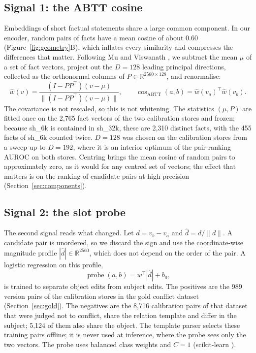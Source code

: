 \documentclass[11pt]{article}
\newcommand{\sub}[1]{\textsf{sh\_#1}}                    %
\begin{document}
\subsection{Signal 1: the ABTT cosine}
\label{sec:abtt}

Embeddings of short factual statements share a large common component. In our encoder, random pairs of facts have a mean cosine of about 0.60 (Figure~\ref{fig:geometry}B), which inflates every similarity and compresses the differences that matter. Following Mu and Viswanath \cite{mu2018abtt}, we subtract the mean $\mu$ of a set of fact vectors, project out the $D=128$ leading principal directions, collected as the orthonormal columns of $P\in\mathbb{R}^{2560\times128}$, and renormalise:
\begin{equation}
\hat w(v)=\frac{(I-PP^{\top})(v-\mu)}{\lVert (I-PP^{\top})(v-\mu)\rVert},\qquad
\cos_{\mathrm{ABTT}}(a,b)=\hat w(v_a)^{\top}\hat w(v_b).
\end{equation}
The covariance is not rescaled, so this is not whitening. The statistics $(\mu,P)$ are fitted once on the 2,765 fact vectors of the two calibration stores and frozen; because \sub{6k} is contained in \sub{32k}, these are 2,310 distinct facts, with the 455 facts of \sub{6k} counted twice. $D=128$ was chosen on the calibration stores from a sweep up to $D=192$, where it is an interior optimum of the pair-ranking AUROC on both stores. Centring brings the mean cosine of random pairs to approximately zero, as it would for any centred set of vectors; the effect that matters is on the ranking of candidate pairs at high precision (Section~\ref{sec:components}).

\subsection{Signal 2: the slot probe}
\label{sec:probe}

The second signal reads what changed. Let $d=v_b-v_a$ and $\hat d=d/\lVert d\rVert$. A candidate pair is unordered, so we discard the sign and use the coordinate-wise magnitude profile $|\hat d|\in\mathbb{R}^{2560}$, which does not depend on the order of the pair. A logistic regression on this profile,
\begin{equation}
\operatorname{probe}(a,b)=w^{\top}|\hat d|+b_0,
\end{equation}
is trained to separate object edits from subject edits. The positives are the 989 version pairs of the calibration stores in the gold conflict dataset (Section~\ref{sec:gold}). The negatives are the 8,716 calibration pairs of that dataset that were judged not to conflict, share the relation template and differ in the subject; 5,124 of them also share the object. The template parser selects these training pairs offline; it is never used at inference, where the probe sees only the two vectors. The probe uses balanced class weights and $C=1$ (scikit-learn \cite{pedregosa2011sklearn}).
\end{document}

